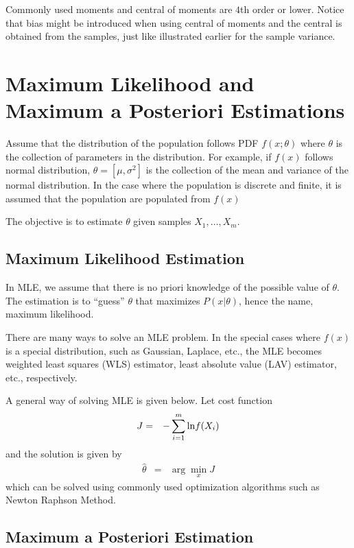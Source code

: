 Commonly used moments and central of moments are $4$th order or lower. Notice that bias might be introduced when using central of moments and the central is obtained from the samples, just like illustrated earlier for the sample variance.

\section{Maximum Likelihood and Maximum a Posteriori Estimations}

Assume that the distribution of the population follows PDF $f(x;\theta)$ where $\theta$ is the collection of parameters in the distribution. For example, if $f(x)$ follows normal distribution, $\theta=[\mu, \sigma^2]$ is the collection of the mean and variance of the normal distribution.  In the case where the population is discrete and finite, it is assumed that the population are populated from $f(x)$

The objective is to estimate $\theta$ given samples $X_1, \ldots, X_m$.

\subsection{Maximum Likelihood Estimation}

In MLE, we assume that there is no priori knowledge of the possible value of $\theta$. The estimation is to ``guess'' $\theta$ that maximizes $P(x|\theta)$, hence the name, maximum likelihood.

There are many ways to solve an MLE problem. In the special cases where $f(x)$ is a special distribution, such as Gaussian, Laplace, etc., the MLE becomes weighted least squares (WLS) estimator, least absolute value (LAV) estimator, etc., respectively.

A general way of solving MLE is given below. Let cost function
\begin{eqnarray}
	J &=& -\sum_{i=1}^{m}\textup{ln}f(X_i) \label{eq:mlecostfunc}
\end{eqnarray}
and the solution is given by
\begin{eqnarray}
	\hat{\theta} &=& \arg\min_{x} J \nonumber
\end{eqnarray}
which can be solved using commonly used optimization algorithms such as Newton Raphson Method.

\subsection{Maximum a Posteriori Estimation}

